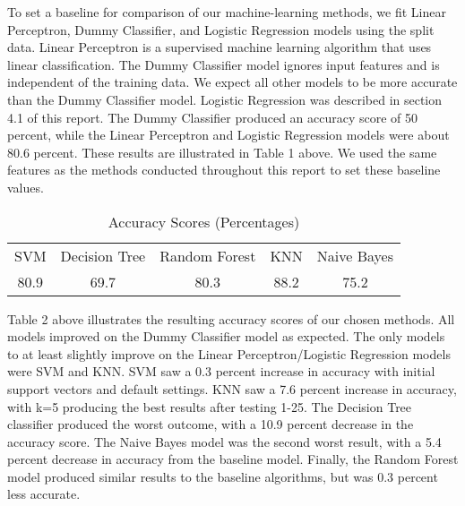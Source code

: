 \documentclass{article}
\begin{document}
To set a baseline for comparison of our machine-learning methods, we fit Linear Perceptron, Dummy Classifier, and Logistic Regression models using the split data. Linear Perceptron is a supervised machine learning algorithm that uses linear classification. The Dummy Classifier model ignores input features and is independent of the training data. We expect all other models to be more accurate than the Dummy Classifier model. Logistic Regression was described in section 4.1 of this report. The Dummy Classifier produced an accuracy score of 50 percent, while the Linear Perceptron and Logistic Regression models were about 80.6 percent. These results are illustrated in Table 1 above. We used the same features as the methods conducted throughout this report to set these baseline values.

\begin{table} [h]
    \centering
    \begin{tabular}{ccccc}
          SVM&  Decision Tree&  Random Forest& KNN& Naive Bayes\\
          80.9&  69.7&  80.3& 88.2& 75.2\\
    \end{tabular}
    \caption{Accuracy Scores (Percentages)}
    \label{tab:my_label}
\end{table}

 Table 2 above illustrates the resulting accuracy scores of our chosen methods. All models improved on the Dummy Classifier model as expected. The only models to at least slightly improve on the Linear Perceptron/Logistic Regression models were SVM and KNN. SVM saw a 0.3 percent increase in accuracy with initial support vectors and default settings. KNN saw a 7.6 percent increase in accuracy, with k=5 producing the best results after testing 1-25. The Decision Tree classifier produced the worst outcome, with a 10.9 percent decrease in the accuracy score. The Naive Bayes model was the second worst result, with a 5.4 percent decrease in accuracy from the baseline model. Finally, the Random Forest model produced similar results to the baseline algorithms, but was 0.3 percent less accurate. 
\end{document}
